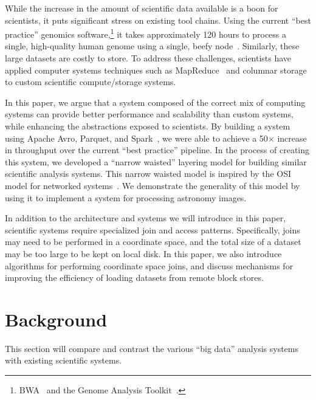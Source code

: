\documentclass{acm_proc_article-sp}
\begin{document}
While the increase in the amount of scientific data available is a boon for scientists, it puts significant
stress on existing tool chains. Using the current ``best practice'' genomics
software,\footnote{BWA~\cite{li10} and the Genome Analysis Toolkit~\cite{mckenna10, depristo11}.}
it takes approximately 120 hours to process a single, high-quality human genome using a single,
beefy node~\cite{talwalkar14}. Similarly, these large datasets are costly to store. To address these
challenges, scientists have applied computer systems techniques such as
MapReduce~\cite{mckenna10} and columnar storage~\cite{fritz11} to custom scientific
compute/storage systems.

In this paper, we argue that a system composed of the correct mix of computing systems can provide
better performance and scalability than custom systems, while enhancing the abstractions exposed to
scientists. By building a system using Apache Avro, Parquet, and Spark~\cite{avro, parquet, zaharia10},
we were able to achieve a 50$\times$ increase in throughput over the current ``best practice'' pipeline.
In the process of creating this system, we developed a ``narrow waisted'' layering model for building
similar scientific analysis systems. This narrow waisted model is inspired by the OSI model for
networked systems~\cite{zimmermann80}. We demonstrate the generality of this model by using it to
implement a system for processing astronomy images.

In addition to the architecture and systems we will introduce in this paper, scientific systems require
specialized join and access patterns. Specifically, joins may need to be performed in a coordinate
space, and the total size of a dataset may be too large to be kept on local disk. In this paper, we also
introduce algorithms for performing coordinate space joins, and discuss mechanisms for improving the
efficiency of loading datasets from remote block stores.

\section{Background}
\label{sec:background}

This section will compare and contrast the various ``big data'' analysis systems with existing
scientific systems.
\end{document}
